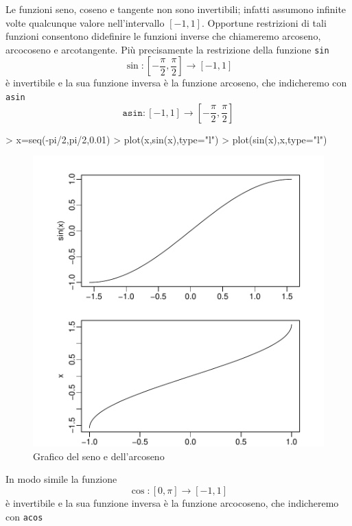 \documentclass[onecolumn,11pt]{book}
\begin{document}
Le funzioni seno, coseno e tangente non sono invertibili; infatti assumono infinite volte qualcunque valore nell'intervallo $[-1,1]$.
Opportune restrizioni di tali funzioni consentono didefinire le funzioni inverse che chiameremo arcoseno, arcocoseno e arcotangente. Pi\`u precisamente
la restrizione della funzione \texttt{sin}
$$\sin\colon [-\frac{\pi}{2},\frac{\pi}{2}]\rightarrow [-1,1]$$
\`e invertibile e la sua funzione inversa \`e  la funzione arcoseno, che indicheremo con \texttt{asin}
$$\texttt{asin}\colon  [-1,1]\rightarrow [-\frac{\pi}{2},\frac{\pi}{2}]$$
\begin{Schunk}
\begin{Sinput}
> x=seq(-pi/2,pi/2,0.01)
> plot(x,sin(x),type="l")
> plot(sin(x),x,type="l")
\end{Sinput}
\end{Schunk}
\begin{center}\begin{figure}

\includegraphics{Rmatematica-106}
\caption{Grafico del seno e dell'arcoseno}
\end{figure}

\end{center}
In modo simile la funzione
$$\cos\colon [0,\pi]\rightarrow [-1,1]$$
 \`e invertibile e la sua funzione inversa \`e  la funzione arcocoseno, che indicheremo con \texttt{acos}
\end{document}
